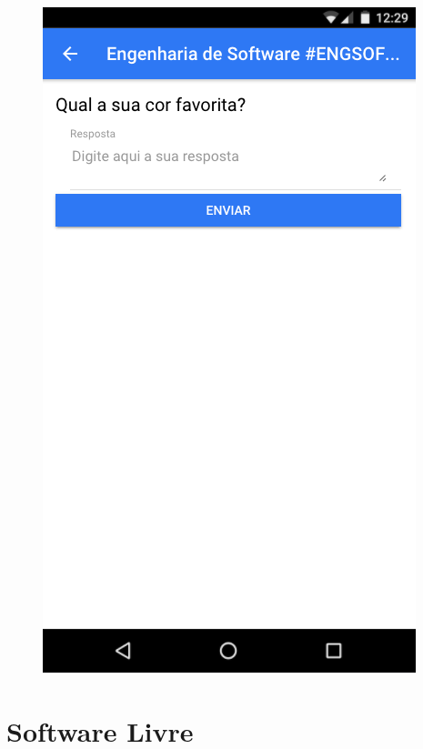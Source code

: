\begin{figure}[H]
{    \includegraphics[scale=.25]{imagens/telas/student_question2}
    \label{fig:student_qb}
  }

  \doautor
    \label{fig:student_q}
\end{figure}

\section{Software Livre}

